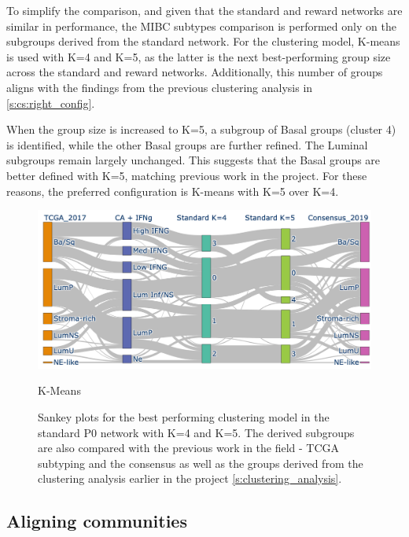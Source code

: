 To simplify the comparison, and given that the standard and reward networks are similar in performance, the MIBC subtypes comparison is performed only on the subgroups derived from the standard network. For the clustering model, K-means is used with K=4 and K=5, as the latter is the next best-performing group size across the standard and reward networks. Additionally, this number of groups aligns with the findings from the previous clustering analysis in \cref{s:cs:right_config}.

When the group size is increased to K=5, a subgroup of Basal groups (cluster 4) is identified, while the other Basal groups are further refined. The Luminal subgroups remain largely unchanged. This suggests that the Basal groups are better defined with K=5, matching previous work in the project. For these reasons, the preferred configuration is K-means with K=5 over K=4.



\begin{figure}[!htb]
    \centering
    \includegraphics[width=\textwidth,keepaspectratio]{Sections/Network_I/Resources/P0/clustering/Sankey_KM_4K_v3.png}
    \caption{K-Means}
    \caption[P0 network derived clusters comparisons with others]{Sankey plots for the best performing clustering model in the standard P0 network with K=4 and K=5. The derived subgroups are also compared with the previous work in the field - TCGA subtyping \citep{Robertson2017-mg} and the consensus \citet{Kamoun2020-tj} as well as the groups derived from the clustering analysis earlier in the project \cref{s:clustering_analysis}. }
    \label{fig:N_I:p0_sky_KMeans}
\end{figure}





\subsection{Aligning communities} \label{s:ap:align_coms}

